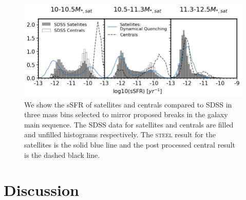 \begin{figure}[h]
	\centering
	\includegraphics[width = \linewidth]{Figures/Chapter4/SSFR.png}
    \caption{We show the sSFR of satellites and centrals compared to SDSS in three mass bins selected to mirror proposed breaks in the galaxy main sequence. The SDSS data for satellites and centrals are filled and unfilled histograms respectively. The \textsc{steel} result for the satellites is the solid blue line and the post processed central result is the dashed black line.}
	\label{fig:sSFR}
\end{figure}

\section{Discussion}

